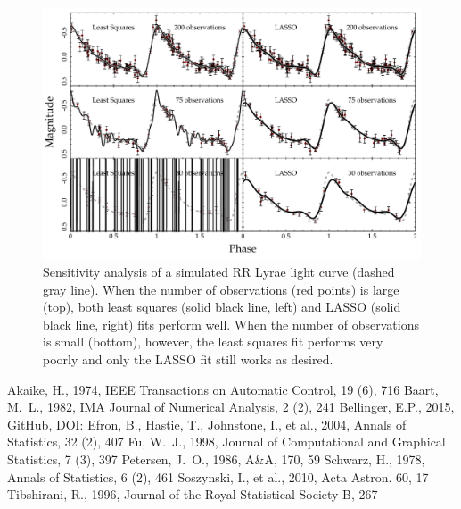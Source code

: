 \documentclass[11pt,twoside]{book}
\begin{document}
\begin{figure}[!ht]
    \centering
    \includegraphics[width=\textwidth,keepaspectratio]{sensitivity.pdf}
    \caption{Sensitivity analysis of a simulated RR Lyrae light curve (dashed gray line). When the number of observations (red points) is large (top), both least squares (solid black line, left) and LASSO (solid black line, right) fits perform well. When the number of observations is small (bottom), however, the least squares fit performs very poorly and only the LASSO fit still works as desired.} 
    \label{fig:sensitivity} 
\end{figure}
\begin{thebibliography}{}      
Akaike, H., 1974, IEEE Transactions on Automatic Control, 19 (6), 716
Baart, M.~L., 1982, IMA Journal of Numerical Analysis, 2 (2), 241
Bellinger, E.P., 2015, GitHub, DOI:
Efron, B., Hastie, T., Johnstone, I., et al., 2004, Annals of Statistics, 32 (2), 407
Fu, W.~J., 1998, Journal of Computational and Graphical Statistics, 7 (3), 397
Petersen, J.~O., 1986, A\&A, 170, 59
Schwarz, H., 1978, Annals of Statistics, 6 (2), 461
Soszynski, I., et al., 2010, Acta Astron. 60, 17
Tibshirani, R., 1996, Journal of the Royal Statistical Society B, 267
\end{thebibliography}
\end{document}

